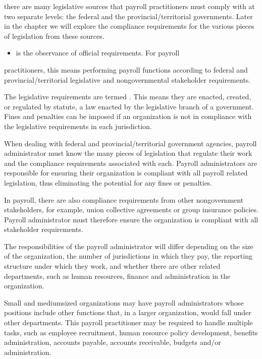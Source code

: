 \documentclass[letterpaper,10pt,english]{sphinxmanual}
\begin{document}
\sphinxAtStartPar
there are many legislative sources that payroll practitioners must comply
with at two separate levels: the federal and the provincial/territorial
governments. Later in the chapter we will explore the compliance
requirements for the various pieces of legislation from these sources.
\begin{itemize}
\item {} 
\sphinxAtStartPar
{} is the observance of official requirements. For payroll

\end{itemize}

\sphinxAtStartPar
practitioners, this means performing payroll functions according to
federal and provincial/territorial legislative and non\sphinxhyphen{}governmental
stakeholder requirements.

\sphinxAtStartPar
The legislative requirements are termed . This means they are
enacted, created, or regulated by statute, a law enacted by the legislative
branch of a government. Fines and penalties can be imposed if an organization
is not in compliance with the legislative requirements in each jurisdiction.

\sphinxAtStartPar
When dealing with federal and provincial/territorial government agencies,
payroll administrator must know the many pieces of legislation that
regulate their work and the compliance requirements associated with each.
Payroll administrators are responsible for ensuring their organization is
compliant with all payroll related legislation, thus eliminating the
potential for any fines or penalties.

\sphinxAtStartPar
In payroll, there are also compliance requirements from other non\sphinxhyphen{}government stakeholders,
for example, union collective agreements or group insurance policies. Payroll administrator
must therefore ensure the organization is compliant with all stakeholder requirements.

\sphinxAtStartPar
The responsibilities of the payroll administrator will differ depending on
the size of the organization, the number of jurisdictions in which they pay,
the reporting structure under which they work, and whether there are other
related departments, such as human resources, finance and administration in
the organization.

\sphinxAtStartPar
Small and medium\sphinxhyphen{}sized organizations may have payroll administrators whose
positions include other functions that, in a larger organization, would
fall under other departments. This payroll practitioner may be required to
handle multiple tasks, such as employee recruitment, human resource policy
development, benefits administration, accounts payable, accounts receivable,
budgets and/or administration.
\end{document}
